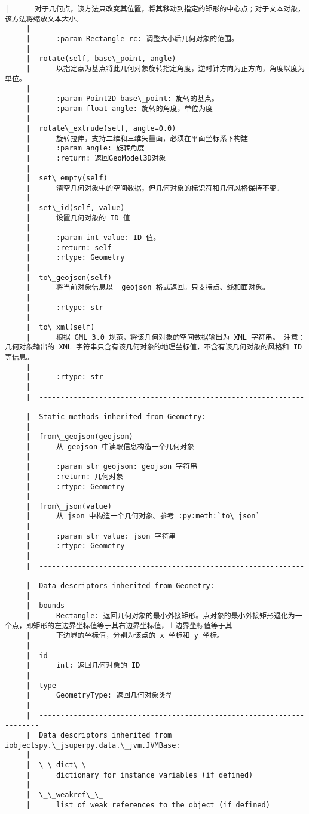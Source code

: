 \documentclass[11pt]{article}
\begin{document}
\begin{Verbatim}[commandchars=\\\{\}]
     |      对于几何点，该方法只改变其位置，将其移动到指定的矩形的中心点；对于文本对象，该方法将缩放文本大小。
     |      
     |      :param Rectangle rc: 调整大小后几何对象的范围。
     |  
     |  rotate(self, base\_point, angle)
     |      以指定点为基点将此几何对象旋转指定角度，逆时针方向为正方向，角度以度为单位。
     |      
     |      :param Point2D base\_point: 旋转的基点。
     |      :param float angle: 旋转的角度，单位为度
     |  
     |  rotate\_extrude(self, angle=0.0)
     |      旋转拉伸，支持二维和三维矢量面，必须在平面坐标系下构建
     |      :param angle: 旋转角度
     |      :return: 返回GeoModel3D对象
     |  
     |  set\_empty(self)
     |      清空几何对象中的空间数据，但几何对象的标识符和几何风格保持不变。
     |  
     |  set\_id(self, value)
     |      设置几何对象的 ID 值
     |      
     |      :param int value: ID 值。
     |      :return: self
     |      :rtype: Geometry
     |  
     |  to\_geojson(self)
     |      将当前对象信息以  geojson 格式返回。只支持点、线和面对象。
     |      
     |      :rtype: str
     |  
     |  to\_xml(self)
     |      根据 GML 3.0 规范，将该几何对象的空间数据输出为 XML 字符串。 注意：几何对象输出的 XML 字符串只含有该几何对象的地理坐标值，不含有该几何对象的风格和 ID 等信息。
     |      
     |      :rtype: str
     |  
     |  ----------------------------------------------------------------------
     |  Static methods inherited from Geometry:
     |  
     |  from\_geojson(geojson)
     |      从 geojson 中读取信息构造一个几何对象
     |      
     |      :param str geojson: geojson 字符串
     |      :return: 几何对象
     |      :rtype: Geometry
     |  
     |  from\_json(value)
     |      从 json 中构造一个几何对象。参考 :py:meth:`to\_json`
     |      
     |      :param str value: json 字符串
     |      :rtype: Geometry
     |  
     |  ----------------------------------------------------------------------
     |  Data descriptors inherited from Geometry:
     |  
     |  bounds
     |      Rectangle: 返回几何对象的最小外接矩形。点对象的最小外接矩形退化为一个点，即矩形的左边界坐标值等于其右边界坐标值，上边界坐标值等于其
     |      下边界的坐标值，分别为该点的 x 坐标和 y 坐标。
     |  
     |  id
     |      int: 返回几何对象的 ID
     |  
     |  type
     |      GeometryType: 返回几何对象类型
     |  
     |  ----------------------------------------------------------------------
     |  Data descriptors inherited from iobjectspy.\_jsuperpy.data.\_jvm.JVMBase:
     |  
     |  \_\_dict\_\_
     |      dictionary for instance variables (if defined)
     |  
     |  \_\_weakref\_\_
     |      list of weak references to the object (if defined)
    

\end{Verbatim}
\end{document}
